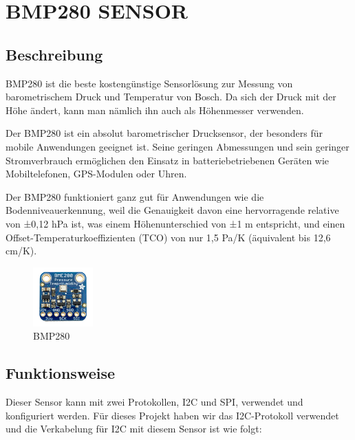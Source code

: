 \documentclass[conference]{IEEEtran}
\begin{document}
\section{BMP280 SENSOR}
\subsection{Beschreibung}
BMP280 ist die beste kostengünstige Sensorlösung zur Messung von barometrischem Druck und Temperatur von Bosch. Da sich der Druck mit der Höhe ändert, kann man nämlich ihn auch als Höhenmesser verwenden. 

Der BMP280 ist ein absolut barometrischer Drucksensor, der besonders für mobile Anwendungen geeignet ist. Seine geringen Abmessungen und sein geringer Stromverbrauch ermöglichen den Einsatz in batteriebetriebenen Geräten wie Mobiltelefonen, GPS-Modulen oder Uhren.

Der BMP280 funktioniert ganz gut für Anwendungen wie die Bodenniveauerkennung, weil die Genauigkeit davon eine hervorragende relative von ±0,12 hPa ist, was einem Höhenunterschied von ±1 m entspricht, und einen Offset-Temperaturkoeffizienten (TCO) von nur 1,5 Pa/K (äquivalent bis 12,6 cm/K).

\begin{figure}[h]
	\centering
	\includegraphics[width=0.47\linewidth]{fig35}
	\caption{BMP280 }
	\label{fig:fig35}
\end{figure}

\subsection{Funktionsweise}
Dieser Sensor kann mit zwei Protokollen, I2C und SPI, verwendet und konfiguriert werden. Für dieses Projekt haben wir das I2C-Protokoll verwendet und die Verkabelung für I2C mit diesem Sensor ist wie folgt:
\end{document}
